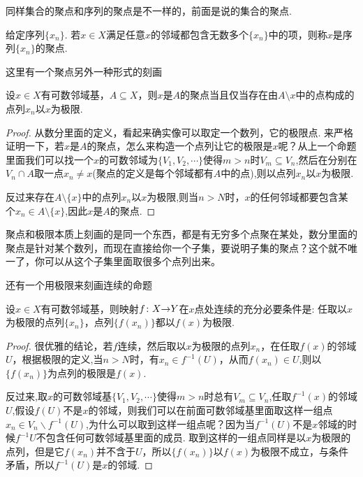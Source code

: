 同样集合的聚点和序列的聚点是不一样的，前面是说的集合的聚点.

\begin{definition}
给定序列$\{x_n\}$. 若$x \in X$满足任意$x$的邻域都包含无数多个$\{x_n\}$中的项，则称$x$是序列$\{x_n\}$的聚点.
\end{definition}

这里有一个聚点另外一种形式的刻画

\begin{proposition}
设$x \in X$有可数邻域基，$A \subseteq X$，则$x$是$A$的聚点当且仅当存在由$A \setminus {x}$中的点构成的点列${x_n}$以$x$为极限.
\end{proposition}

\begin{proof}
从数分里面的定义，看起来确实像可以取定一个数列，它的极限点. 来严格证明一下，若$x$是$A$的聚点，怎么来构造一个点列让它的极限是$x$呢？从上一个命题里面我们可以找一个$x$的可数邻域为$\{V_1,V_2,\cdots\}$使得$m > n$时$V_m \subseteq V_n$,然后在分别在$V_n \cap A$取一点$x_n \neq x$(聚点的定义是每个邻域都有$A$中的点),则以点列${x_n}$以$x$为极限.

反过来存在$A \setminus \{x\}$中的点列${x_n}$以$x$为极限,则当$n >N$时，$x$的任何邻域都要包含某个$x_n \in A \setminus \{x\}$,因此$x$是$A$的聚点.
\end{proof}

聚点和极限本质上刻画的是同一个东西，都是有无穷多个点聚在某处，数分里面的聚点是针对某个数列，而现在直接给你一个子集，要说明子集的聚点？这个就不唯一了，你可以从这个子集里面取很多个点列出来。



还有一个用极限来刻画连续的命题

\begin{proposition}
设$x \in X$有可数邻域基，则映射${f}\colon{X}{\to}{Y}$在$x$点处连续的充分必要条件是: 任取以$x$为极限的点列$\{x_n\}$，点列$\{f(x_n)\}$都以$f(x)$为极限.
\end{proposition}

\begin{proof}
很优雅的结论，若$f$连续，然后取以$x$为极限的点列$x_n$，在任取$f(x)$的邻域$U$，根据极限的定义,当$n > N$时，有$x_n \in f^{-1}(U)$，从而$f(x_n) \in U$,则以$\{f(x_n)\}$为点列的极限是$f(x)$.

反过来,取$x$的可数邻域基$\{V_1,V_2,\cdots\}$使得$m > n$时总有$V_m \subseteq V_n$,任取$f^{-1}(x)$的邻域$U$,假设$f(U)$不是$x$的邻域，则我们可以在前面可数邻域基里面取这样一组点$x_n \in V_n \smallsetminus f^{-1}(U)$,为什么可以取到这样一组点呢？因为当$f^{-1}(U)$不是$x$邻域的时候$f^{-1}{U}$不包含任何可数邻域基里面的成员. 取到这样的一组点同样是以$x$为极限的点列，但是它$f(x_n)$并不含于$U$，所以$\{f(x_n)\}$以$f(x)$为极限不成立，与条件矛盾，所以$f^{-1}(U)$是$x$的邻域.
\end{proof}

